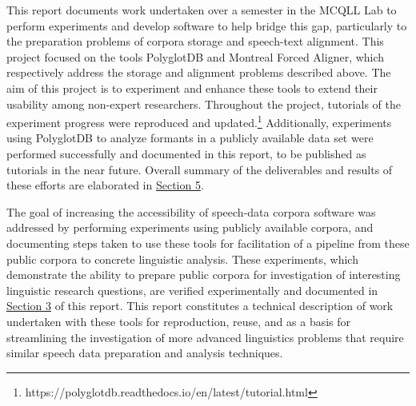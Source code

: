 \documentclass[11pt]{article}
\begin{document}
This report documents work undertaken over a semester in the MCQLL Lab to perform experiments and develop software to help bridge this gap, particularly to the preparation problems of corpora storage and speech-text alignment. This project focused on the tools PolyglotDB\cite{mcauliffe_polyglot_2017} and Montreal Forced Aligner\cite{mcauliffe_montreal_nodate}, which respectively address the storage and alignment problems described above. The aim of this project is to experiment and enhance these tools to extend their usability among non-expert researchers. Throughout the project, tutorials of the experiment progress were reproduced and updated.\footnote{https://polyglotdb.readthedocs.io/en/latest/tutorial.html} Additionally, experiments using PolyglotDB to analyze formants in a publicly available data set were performed successfully and documented in this report, to be published as tutorials in the near future. Overall summary of the deliverables and results of these efforts are elaborated in \hyperlink{section.5}{Section 5}.

The goal of increasing the accessibility of speech-data corpora software was addressed by performing experiments using publicly available corpora, and documenting steps taken to use these tools for facilitation of a pipeline from these public corpora to concrete linguistic analysis. These experiments, which demonstrate the ability to prepare public corpora for investigation of interesting linguistic research questions, are verified experimentally and documented in \hyperlink{section.3}{Section 3} of this report. This report constitutes a technical description of work undertaken with these tools for reproduction, reuse, and as a basis for streamlining the investigation of more advanced linguistics problems that require similar speech data preparation and analysis techniques.
\end{document}
